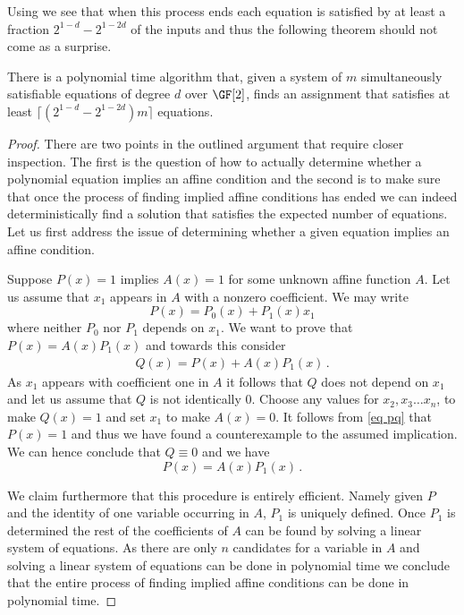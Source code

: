 Using  we see
that when this process ends each equation
is satisfied by at least a fraction
$2^{1-d}-2^{1-2d}$ of the inputs and thus the following
theorem should not come as a surprise.

\begin{theorem}\label{thm upper sat}
There is a polynomial time algorithm that,
given a system of $m$ simultaneously satisfiable equations
of degree $d$ over $\GF[2]$, finds an
assignment that satisfies at least
$\lceil (2^{1-d}-2^{1-2d})m\rceil$ equations.
\end{theorem}

\begin{proof}
There are two points in the outlined argument
that require closer inspection.  The
first is the question of how to actually determine whether a 
polynomial equation implies an affine condition
and the second is to make sure that once
the process of finding implied affine conditions
has ended we can indeed deterministically find a
solution that satisfies the expected number of
equations.
Let us first address the issue of determining
whether a given equation implies an affine
condition.

Suppose $P(x)=1$ implies $A(x)=1$
for some unknown affine function $A$.
Let us assume that $x_1$ appears in $A$ with
a nonzero coefficient.  
We may write
$$
P(x)=P_0(x)+P_1(x)x_1$$
where neither $P_0$ nor $P_1$ depends on $x_1$.  We want
to prove that $P(x)=A(x)P_1(x)$ and towards this consider
\begin{eqnarray}\label{eq pq}
Q(x)=P(x)+A(x)P_1(x)\,.
\end{eqnarray}
As $x_1$ appears with coefficient one in $A$ it follows
that $Q$ does not depend on $x_1$ and let us assume that
$Q$ is not identically 0.  Choose any values
for $x_2, x_3 \ldots x_n$, to make $Q(x)=1$
and set $x_1$ to make $A(x)=0$.  It follows
from \eqref{eq pq} that $P(x)=1$ 
and thus we have found a counterexample 
to the assumed implication.  We can hence conclude
that $Q\equiv 0$ and we have 
$$
P(x)=A(x) P_1(x)\,.
$$

We claim furthermore that this procedure is entirely
efficient.  Namely given $P$ and the identity of
one variable occurring in $A$, $P_1$ is uniquely
defined.  Once $P_1$ is determined the rest
of the coefficients of $A$ can be found by
solving a linear system of equations.
As there are only $n$ candidates for a variable
in $A$ and solving a linear system of equations
can be done in polynomial time we conclude that the entire
process of finding implied affine conditions
can be done in polynomial time.


\end{proof}
